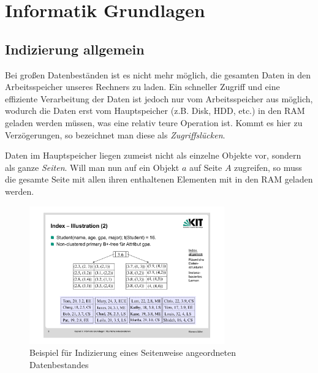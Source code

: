 \section{Informatik Grundlagen}

\subsection{Indizierung allgemein}
Bei großen Datenbeständen ist es nicht mehr möglich, die gesamten Daten in den
Arbeitsspeicher unseres Rechners zu laden. Ein schneller Zugriff und eine
effiziente Verarbeitung der Daten ist jedoch nur
vom Arbeitsspeicher aus möglich, wodurch die Daten erst vom Hauptspeicher (z.B. Disk,
HDD, etc.) in den RAM geladen werden müssen, was eine relativ teure Operation ist.
Kommt es hier zu Verzögerungen, so bezeichnet man diese als \textit{Zugriffslücken}.

Daten im Hauptspeicher liegen zumeist nicht als einzelne Objekte vor, sondern als
ganze \textit{Seiten}. Will man nun auf ein Objekt \(a\) auf Seite \(A\) zugreifen,
so muss die gesamte Seite mit allen ihren enthaltenen Elementen mit in den RAM geladen
werden.

\begin{figure}[ht]
	\centering
	\includegraphics[width=0.75\textwidth]{Figures/index_example}
	\caption[Indizierung Beispiel]{Beispiel für Indizierung eines Seitenweise angeordneten
		Datenbestandes\footnotemark}
	\label{fig:index_example}
\end{figure}

